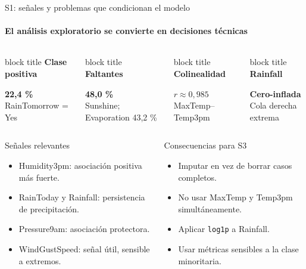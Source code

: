 \documentclass[aspectratio=169,10pt]{beamer}
\newcommand{\metric}[3]{%
  \begingroup
  \setlength{\fboxsep}{0pt}%
  \colorbox{panel}{%
    \begin{minipage}[t][1.85cm][c]{\linewidth}
      \begin{beamercolorbox}[wd=\linewidth,ht=0.45cm,dp=0.12cm,leftskip=0.12cm]{block title}
        \scriptsize\bfseries #1
      \end{beamercolorbox}
      \vspace{0.08cm}
      \centering
      {\Large\bfseries #2}\\[-1pt]
      {\scriptsize #3}
    \end{minipage}%
  }%
  \endgroup
}
\begin{document}
\begin{frame}{S1: señales y problemas que condicionan el modelo}
\framesubtitle{El análisis exploratorio se convierte en decisiones técnicas}
\begin{columns}[T,onlytextwidth]
\metric{Clase positiva}{22,4 \%}{RainTomorrow = Yes}
\metric{Faltantes}{48,0 \%}{Sunshine; Evaporation 43,2 \%}
\metric{Colinealidad}{$r \approx 0{,}985$}{MaxTemp--Temp3pm}
\metric{Rainfall}{Cero-inflada}{Cola derecha extrema}
\end{columns}
\vspace{0.15cm}
\begin{columns}[T,onlytextwidth]
\begin{block}{Señales relevantes}
\begin{itemize}
\item Humidity3pm: asociación positiva más fuerte.
\item RainToday y Rainfall: persistencia de precipitación.
\item Pressure9am: asociación protectora.
\item WindGustSpeed: señal útil, sensible a extremos.
\end{itemize}
\end{block}
\begin{block}{Consecuencias para S3}
\begin{itemize}
\item Imputar en vez de borrar casos completos.
\item No usar MaxTemp y Temp3pm simultáneamente.
\item Aplicar \texttt{log1p} a Rainfall.
\item Usar métricas sensibles a la clase minoritaria.
\end{itemize}
\end{block}
\end{columns}
\end{frame}
\end{document}
